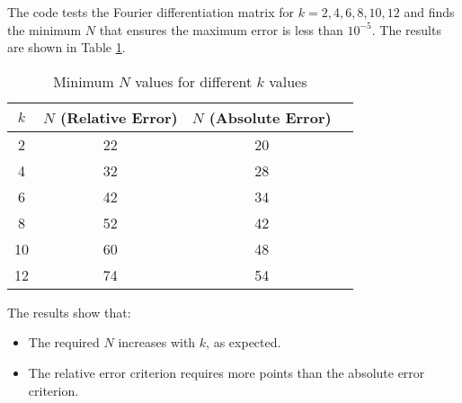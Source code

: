 \documentclass[a4paper, 12pt]{article}
\begin{document}
The code tests the Fourier differentiation matrix for $k = 2, 4, 6, 8, 10, 12$ and finds the minimum $N$ that ensures the maximum error is less than $10^{-5}$. The results are shown in Table \ref{tab:fourier_results}.

\begin{table}[H]
    \centering
    \begin{tabular}{cccc}
        \toprule
        $k$ & $N$ (Relative Error) & $N$ (Absolute Error) \\
        \midrule
        2 & 22 & 20 \\
        4 & 32 & 28 \\
        6 & 42 & 34 \\
        8 & 52 & 42 \\
        10 & 60 & 48 \\
        12 & 74 & 54 \\
        \bottomrule
    \end{tabular}
    \caption{Minimum $N$ values for different $k$ values}
    \label{tab:fourier_results}
\end{table}

The results show that:
\begin{itemize}
    \item The required $N$ increases with $k$, as expected.
    \item The relative error criterion requires more points than the absolute error criterion.
\end{itemize}
\end{document}

